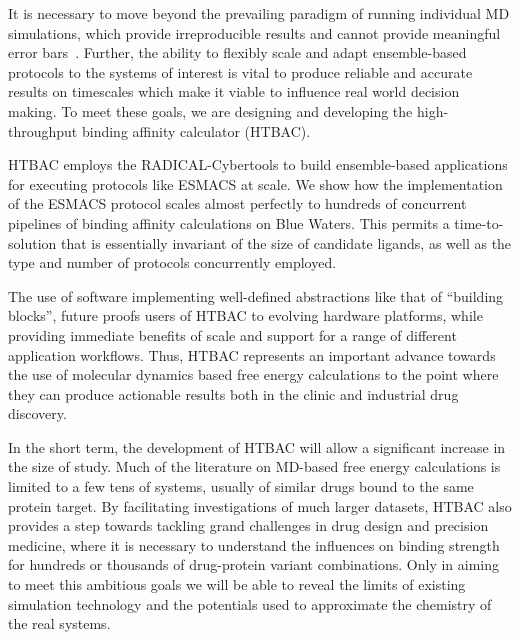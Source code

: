 \documentclass{bmcart}
\begin{document}
It is necessary to move beyond the prevailing paradigm of running individual
MD simulations, which provide irreproducible results and cannot provide
meaningful error bars~\cite{Bhati2017}. Further, the ability to flexibly
scale and adapt ensemble-based protocols to the systems of interest is vital
to produce reliable and accurate results on timescales which make it viable
to influence real world decision making. To meet these goals, we are
designing and developing the high-throughput binding affinity calculator
(HTBAC).

HTBAC employs the RADICAL-Cybertools to build ensemble-based applications for
executing protocols like ESMACS at scale. We show how the implementation of
the ESMACS protocol scales almost perfectly to hundreds of concurrent
pipelines of binding affinity calculations on Blue Waters. 
This permits a time-to-solution that is essentially invariant of the size
of candidate ligands, as well as the type and number of protocols concurrently employed.



The use of software implementing well-defined abstractions like that of
``building blocks'', future proofs users of HTBAC to evolving hardware
platforms, while providing immediate benefits of scale and support for a
range of different application workflows. Thus, HTBAC represents an important
advance towards the use of molecular dynamics based free energy calculations
to the point where they can produce actionable results both in the clinic and
industrial drug discovery.

In the short term, the development of HTBAC will allow a significant increase
in the size of study. Much of the literature on MD-based free energy
calculations is limited to a few tens of systems, usually of similar drugs
bound to the same protein target. By facilitating investigations of much
larger datasets, HTBAC also provides a step towards tackling grand challenges
in drug design and precision medicine, where it is necessary to understand
the influences on binding strength for hundreds or thousands of drug-protein
variant combinations. Only in aiming to meet this ambitious goals we will be
able to reveal the limits of existing simulation technology and the
potentials used to approximate the chemistry of the real systems.
\end{document}
